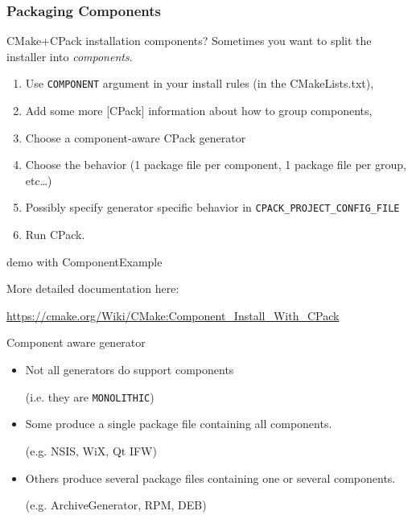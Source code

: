 \documentclass[compress,slidestop,table
              ]
               {beamer}
\newcommand{\fname}[1]{\texttt{#1}}
\begin{document}
\begin{frame}
\frametitle{Packaging Components}
\vspace*{-0.7cm}
\begin{block}{CMake+CPack installation components?}
Sometimes you want to split the installer into \emph{components}.
\end{block}
\vspace*{-0.7cm}
\begin{enumerate}
\item Use \fname{COMPONENT} argument in your install rules
      (in the CMakeLists.txt),
\item Add some more [CPack] information about how to group
      components,
\item Choose a component-aware CPack generator
\item Choose the behavior (1 package file per component, 1 package file
      per group, etc\ldots)
\item Possibly specify generator specific behavior in \fname{CPACK\_PROJECT\_CONFIG\_FILE}
\item Run CPack.
\end{enumerate}
\begin{center}
\alert{demo with ComponentExample}
\end{center}

More detailed documentation here:

{\scriptsize \url{https://cmake.org/Wiki/CMake:Component_Install_With_CPack}}
\begin{alertblock}{Component aware generator}
\begin{itemize}
\item Not all generators do support components

      (i.e. they are \fname{MONOLITHIC})
\item Some produce a single package file containing all components.

      (e.g. NSIS, WiX, Qt IFW)
\item Others produce several package files containing one or several components.

      (e.g. ArchiveGenerator, RPM, DEB)
\end{itemize}
\end{alertblock}
\end{frame}


\end{document}
